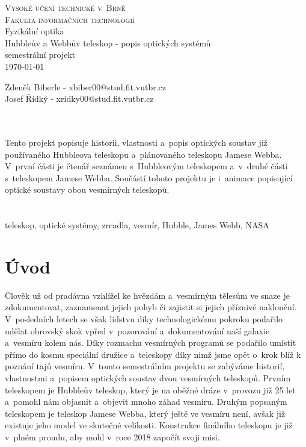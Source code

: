 \documentclass[a4paper,11pt]{article}
\begin{document}
\begin{titlepage}
\begin{center}
\Huge
\textsc{Vysoké učení technické v~Brně\\ \huge Fakulta informačních technologií}\\
\Huge Fyzikální optika \\ 
\LARGE Hubbleův a Webbův teleskop - popis optických systémů  \\
semestrální projekt \\
\today
{}
\end{center}
\Large Zdeněk Biberle - xbiber00@stud.fit.vutbr.cz \\ Josef Řídký - xridky00@stud.fit.vutbr.cz
\end{titlepage}
\newpage

\Large{}\\
\normalsize\noindent\\ Tento projekt popisuje historii, vlastnosti a~popis optických soustav již používaného Hubbleova teleskopu a~plánovaného teleskopu Jamese Webba. V~první části je čtenář seznámen s~Hubbleovým teleskopem a~v~druhé části s~teleskopem Jamese Webba. Součástí tohoto projektu je i~animace popisující optické soustavy obou vesmírných teleskopů.\\
\\
\Large{}\\
\normalsize\noindent teleskop, optické systémy, zrcadla, vesmír, Hubble, James Webb, NASA\\
\newpage

\tableofcontents

\newpage


\section{Úvod}
Člověk už od pradávna vzhlížel ke hvězdám a~vesmírným tělesům ve snaze je zdokumentovat, zaznamenat jejich pohyb či zajistit si jejich příznivé naklonění. V~posledních letech se však lidstvu díky technologickému pokroku podařilo udělat obrovský skok vpřed v~pozorování a~dokumentování naší galaxie a~vesmíru kolem nás. Díky rozmachu vesmírných programů se podařilo umístit přímo do kosmu speciální družice a~teleskopy díky nimž jsme opět o~krok blíž k poznání tajů vesmíru. V~tomto semestrálním projektu se zabýváme historií, vlastnostmi a~popisem optických soustav dvou vesmírných teleskopů. Prvním teleskopem je Hubbleův teleskop, který je na oběžné dráze v~provozu již 25 let a~pomohl nám objasnit a~objevit mnoho záhad vesmíru. Druhým popsaným teleskopem je teleskop Jamese Webba, který ještě ve vesmíru není, avšak již existuje jeho model ve skutečné velikosti. Konstrukce finálního teleskopu je již v~plném proudu, aby mohl v~roce 2018 započít svoji misi. 
\end{document}
